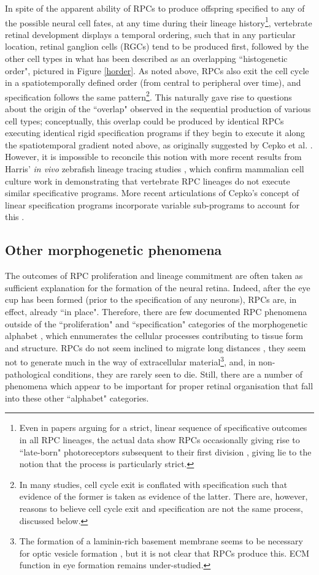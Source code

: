 In spite of the apparent ability of RPCs to produce offspring specified to any of the possible neural cell fates, at any time during their lineage history\footnote{Even in papers arguing for a strict, linear sequence of specificative outcomes in all RPC lineages, the actual data show RPCs occasionally giving rise to ``late-born" photoreceptors subsequent to their first division \cite{Wong2009}, giving lie to the notion that the process is particularly strict.}, vertebrate retinal development displays a temporal ordering, such that in any particular location, retinal ganglion cells (RGCs) tend to be produced first, followed by the other cell types in what has been described as an overlapping ``histogenetic order", pictured in Figure \ref{horder}. As noted above, RPCs also exit the cell cycle in a spatiotemporally defined order (from central to peripheral over time), and specification follows the same pattern\footnote{In many studies, cell cycle exit is conflated with specification such that evidence of the former is taken as evidence of the latter. There are, however, reasons to believe cell cycle exit and specification are not the same process, discussed below.}. This naturally gave rise to questions about the origin of the ``overlap" observed in the sequential production of various cell types; conceptually, this overlap could be produced by identical RPCs executing identical rigid specification programs if they begin to execute it along the spatiotemporal gradient noted above, as originally suggested by Cepko et al. \cite{Cepko1996}. However, it is impossible to reconcile this notion with more recent results from Harris' \textit{in vivo} zebrafish lineage tracing studies \cite{Das2003,He2012,Boije2015}, which confirm mammalian cell culture work in demonstrating that vertebrate RPC lineages do not execute similar specificative programs. More recent articulations of Cepko's concept of linear specification programs incorporate variable sub-programs to account for this \cite{Cepko2014}.

\subsection{Other morphogenetic phenomena}
The outcomes of RPC proliferation and lineage commitment are often taken as sufficient explanation for the formation of the neural retina. Indeed, after the eye cup has been formed (prior to the specification of any neurons), RPCs are, in effect, already ``in place". Therefore, there are few documented RPC phenomena outside of the ``proliferation" and ``specification" categories of the morphogenetic alphabet \cite{Larsen1992}, which ennumerates the cellular processes contributing to tissue form and structure. RPCs do not seem inclined to migrate long distances , they seem not to generate much in the way of extracellular material\footnote{The formation of a laminin-rich basement membrane seems to be necessary for optic vesicle formation \cite{Ivanovitch2013}, but it is not clear that RPCs produce this. ECM function in eye formation remains under-studied.}, and, in non-pathological conditions, they are rarely seen to die. Still, there are a number of phenomena which appear to be important for proper retinal organisation that fall into these other ``alphabet" categories.

